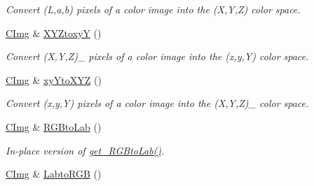 \begin{DoxyCompactItemize}
\begin{DoxyCompactList}\small\item\em Convert (L,a,b) pixels of a color image into the (X,Y,Z) color space. \item\end{DoxyCompactList}\item 
\hypertarget{structcimg__library_1_1_c_img_a3dbc3a0638243338884cb8e6d860f1c8}{
\hyperlink{structcimg__library_1_1_c_img}{CImg} \& \hyperlink{structcimg__library_1_1_c_img_a3dbc3a0638243338884cb8e6d860f1c8}{XYZtoxyY} ()}
\label{structcimg__library_1_1_c_img_a3dbc3a0638243338884cb8e6d860f1c8}

\begin{DoxyCompactList}\small\item\em Convert (X,Y,Z)\_ pixels of a color image into the (x,y,Y) color space. \item\end{DoxyCompactList}\item 
\hypertarget{structcimg__library_1_1_c_img_aeaa1683d6d9c57dd74791c0bd8fac746}{
\hyperlink{structcimg__library_1_1_c_img}{CImg} \& \hyperlink{structcimg__library_1_1_c_img_aeaa1683d6d9c57dd74791c0bd8fac746}{xyYtoXYZ} ()}
\label{structcimg__library_1_1_c_img_aeaa1683d6d9c57dd74791c0bd8fac746}

\begin{DoxyCompactList}\small\item\em Convert (x,y,Y) pixels of a color image into the (X,Y,Z)\_ color space. \item\end{DoxyCompactList}\item 
\hypertarget{structcimg__library_1_1_c_img_ad1b6f0b5c01709684a83d949a3fb9167}{
\hyperlink{structcimg__library_1_1_c_img}{CImg} \& \hyperlink{structcimg__library_1_1_c_img_ad1b6f0b5c01709684a83d949a3fb9167}{RGBtoLab} ()}
\label{structcimg__library_1_1_c_img_ad1b6f0b5c01709684a83d949a3fb9167}

\begin{DoxyCompactList}\small\item\em In-\/place version of \hyperlink{structcimg__library_1_1_c_img_ade3fedd1d3e1b3bd5a31bdd99bc3c797}{get\_\-RGBtoLab()}. \item\end{DoxyCompactList}\item 
\hypertarget{structcimg__library_1_1_c_img_a6e43f6bf99de6917ec2b913fb56d9ce9}{
\hyperlink{structcimg__library_1_1_c_img}{CImg} \& \hyperlink{structcimg__library_1_1_c_img_a6e43f6bf99de6917ec2b913fb56d9ce9}{LabtoRGB} ()}
\label{structcimg__library_1_1_c_img_a6e43f6bf99de6917ec2b913fb56d9ce9}


\end{DoxyCompactItemize}
